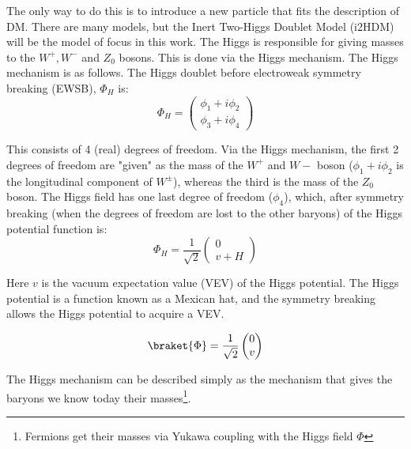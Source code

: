 \documentclass[12pt]{article}
\begin{document}
The only way to do this is to introduce a new particle that fits the description of DM. There are many models, but the Inert Two-Higgs Doublet Model (i2HDM) will be the model of focus in this work. The Higgs is responsible for giving masses to the $W^+, W^-$ and $Z_0$ bosons. This is done via the Higgs mechanism. The Higgs mechanism is as follows.
The Higgs doublet before electroweak symmetry breaking (EWSB), $\Phi_H$ is:
\begin{equation}
    \Phi_H =
    \begin{pmatrix}
        {\phi_1 + i\phi_2} \\
        {\phi_3 + i\phi_4}
    \end{pmatrix}
\end{equation}

% 

This consists of 4 (real) degrees of freedom. Via the Higgs mechanism, the first 2 degrees of freedom are "given" as the mass of the $W^+$ and $W-$ boson ($\phi_1 + i\phi_2$ is the longitudinal component of $W^\pm$), whereas the third is the mass of the $Z_0$ boson. The Higgs field has one last degree of freedom ($\phi_4$), which, after symmetry breaking (when the degrees of freedom are lost to the other baryons) of the Higgs potential function is: 
\begin{equation}
    \Phi_H = \frac{1}{\sqrt{2}}
    \begin{pmatrix}
        {0} \\
        {v + H}
    \end{pmatrix}
\end{equation}

Here $v$ is the vacuum expectation value (VEV) of the Higgs potential. The Higgs potential is a function known as a Mexican hat, and the symmetry breaking allows the Higgs potential to acquire a VEV.

\begin{equation}
    \braket{\Phi} = \frac{1}{\sqrt{2}}
    \begin{pmatrix}
        0\\
        v
    \end{pmatrix}
\end{equation}

The Higgs mechanism can be described simply as the mechanism that gives the baryons we know today their masses\footnote{Fermions get their masses via Yukawa coupling with the Higgs field $\Phi$}.
\end{document}
